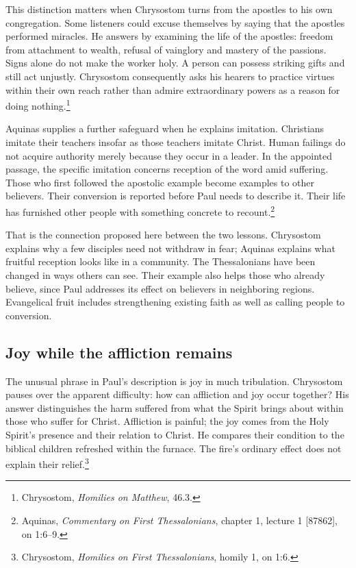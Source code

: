 This distinction matters when Chrysostom turns from the apostles to his own congregation. Some listeners could excuse themselves by saying that the apostles performed miracles. He answers by examining the life of the apostles: freedom from attachment to wealth, refusal of vainglory and mastery of the passions. Signs alone do not make the worker holy. A person can possess striking gifts and still act unjustly. Chrysostom consequently asks his hearers to practice virtues within their own reach rather than admire extraordinary powers as a reason for doing nothing.\footnote{Chrysostom, \textit{Homilies on Matthew}, 46.3.}

Aquinas supplies a further safeguard when he explains imitation. Christians imitate their teachers insofar as those teachers imitate Christ. Human failings do not acquire authority merely because they occur in a leader. In the appointed passage, the specific imitation concerns reception of the word amid suffering. Those who first followed the apostolic example become examples to other believers. Their conversion is reported before Paul needs to describe it. Their life has furnished other people with something concrete to recount.\footnote{Aquinas, \textit{Commentary on First Thessalonians}, chapter 1, lecture 1 [87862], on 1:6--9.}

That is the connection proposed here between the two lessons. Chrysostom explains why a few disciples need not withdraw in fear; Aquinas explains what fruitful reception looks like in a community. The Thessalonians have been changed in ways others can see. Their example also helps those who already believe, since Paul addresses its effect on believers in neighboring regions. Evangelical fruit includes strengthening existing faith as well as calling people to conversion.

\subsection{Joy while the affliction remains}

The unusual phrase in Paul's description is joy in much tribulation. Chrysostom pauses over the apparent difficulty: how can affliction and joy occur together? His answer distinguishes the harm suffered from what the Spirit brings about within those who suffer for Christ. Affliction is painful; the joy comes from the Holy Spirit's presence and their relation to Christ. He compares their condition to the biblical children refreshed within the furnace. The fire's ordinary effect does not explain their relief.\footnote{Chrysostom, \textit{Homilies on First Thessalonians}, homily 1, on 1:6.}

